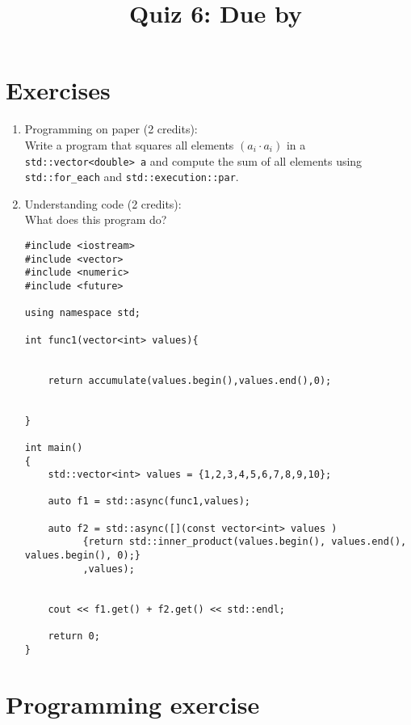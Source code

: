 \documentclass[11pt]{article}
\begin{document}
\title{\coursename~Quiz 6: Due by }
\date{}
\maketitle

\medskip


\section*{Exercises}

\begin{enumerate}
\item Programming on paper (2 credits): \\
Write a program that squares all elements $(a_i \cdot a_i)$ in a \lstinline|std::vector<double> a| and compute the sum of all elements using \lstinline|std::for_each| and \lstinline|std::execution::par|.


\item Understanding code (2 credits): \\
What does this program do?
\begin{lstlisting}
#include <iostream>
#include <vector>
#include <numeric>
#include <future>

using namespace std;

int func1(vector<int> values){
    
    
    return accumulate(values.begin(),values.end(),0);
    
    
}

int main()
{
    std::vector<int> values = {1,2,3,4,5,6,7,8,9,10};
    
    auto f1 = std::async(func1,values);
    
    auto f2 = std::async([](const vector<int> values )
          {return std::inner_product(values.begin(), values.end(), values.begin(), 0);}
          ,values);
    
    
    cout << f1.get() + f2.get() << std::endl;

    return 0;
}
\end{lstlisting}


\end{enumerate}

\section*{Programming exercise}
\end{document}
